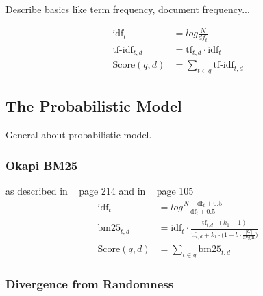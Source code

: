
Describe basics like term frequency, document frequency...

\begin{equation}
  \begin{split}
    \text{idf}_t & = log \frac{N}{df_t} \\
    \text{tf-idf}_{t, d} & = \text{tf}_{t, d} \cdot \text{idf}_t \\
    \text{Score}(q, d) & = \sum_{t \in q}\text{tf-idf}_{t, d}
  \end{split}
\end{equation}

\subsection{The Probabilistic Model}
\label{sec:the_probabilistic_model}

General about probabilistic model.

\subsubsection{Okapi BM25}
\label{sec:okapi_bm25}
as described in ~\cite{manning2008} page 214 and in ~\cite{ModernInvormationRetrieval1999} page 105
\begin{equation}
  \begin{split}
    \text{idf}_t & = log \frac{N - \text{df}_t + 0.5}{\text{df}_t + 0.5} \\
    \text{bm25}_{t, d} & = \text{idf}_t \cdot \frac{\text{tf}_{t, d} \cdot (k_1 + 1)}{\text{tf}_{t, d} + k_1 \cdot \bigl(1 - b \cdot \frac{|G|}{\text{avgdl}}\bigr)}  \\
    \text{Score}(q, d) & = \sum_{t \in q}\text{bm25}_{t, d}
  \end{split}
\end{equation}


\subsubsection{Divergence from Randomness}
\label{sec:divergence_from_randomness}

